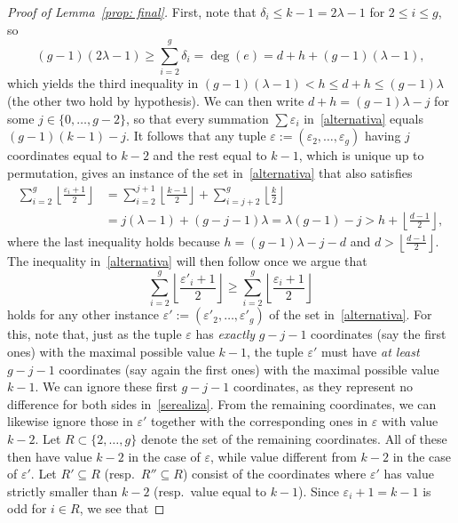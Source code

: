 \documentclass[10pt,a4paper]{amsart}
\begin{document}
\begin{proof}[Proof of Lemma~\ref{prop: final}]
First, note that $\delta_i\leq k-1=2\lambda-1$ for $2\leq i\leq g$, so 
\[
(g-1)(2\lambda-1)\geq\sum_{i=2}^g\delta_i=\deg(e)=d+h+(g-1)(\lambda-1),
\]
which yields the third inequality in
$(g-1)(\lambda-1)<h\leq d+h\le (g-1)\lambda$
(the other two hold by hypothesis). We can then write $d+h=(g-1)\lambda-j$ for some $j\in\{0,\ldots,g-2\}$, so that every summation $\sum\varepsilon_i$ in~\eqref{alternativa} equals $(g-1)(k-1)-j$. It follows that any tuple $\varepsilon:=(\varepsilon_2,\ldots,\varepsilon_g)$ having $j$ coordinates equal to $k-2$ and the rest equal to $k-1$, which is unique up to permutation, gives an instance of the set in~\eqref{alternativa} that also satisfies
\begin{align*}
\sum_{i=2}^g\left\lfloor \frac{\varepsilon_i+1}{2} \right\rfloor &= \sum_{i=2}^{j+1}\left\lfloor \frac{k-1}{2}\right\rfloor+\sum_{i=j+2}^g\left\lfloor \frac{k}{2}  \right\rfloor\\&=j(\lambda-1)
+(g-j-1)\lambda=\lambda(g-1)-j>h+\left\lfloor\frac{d-1}2\right\rfloor,
\end{align*}
where the last inequality holds because $h=(g-1)\lambda-j-d$ and $d>\left\lfloor\frac{d-1}2\right\rfloor$. The inequality in~\eqref{alternativa} will then follow once we argue that
\begin{equation}\label{serealiza}
\sum_{i=2}^g\left\lfloor\frac{\varepsilon'_i+1}2\right\rfloor\geq \sum_{i=2}^g\left\lfloor\frac{\varepsilon_i+1}2\right\rfloor
\end{equation}
holds for any other instance $\varepsilon':=(\varepsilon'_2,\ldots,\varepsilon'_g)$ of the set in~\eqref{alternativa}. For this, note that, just as the tuple $\varepsilon$ has \emph{exactly} $g-j-1$ coordinates (say the first ones) with the maximal possible value $k-1$, the tuple $\varepsilon'$ must have \emph{at least} $g-j-1$ coordinates (say again the first ones) with the maximal possible value $k-1$. We can ignore these first $g-j-1$ coordinates, as they represent no difference for both sides in~\eqref{serealiza}. From the remaining coordinates, we can likewise ignore those in $\varepsilon'$ together with the corresponding ones in $\varepsilon$ with value $k-2$. Let $R\subset\{2,\ldots,g\}$ denote the set of the remaining coordinates. All of these then have value $k-2$ in the case of $\varepsilon$, while value different from $k-2$ in the case of $\varepsilon'$. Let $R'\subseteq R$ (resp.~$R''\subseteq R$) consist of the coordinates where $\varepsilon'$ has value strictly smaller than $k-2$ (resp.~value equal to $k-1$). Since $\varepsilon_i+1=k-1$  is odd for $i\in R$, we see that

\end{proof}
\end{document}
